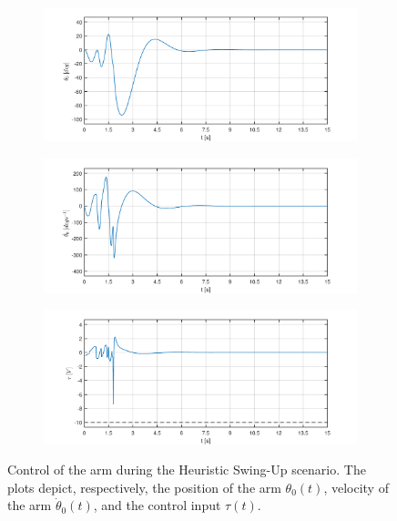 \begin{figure}[H]
	\centering
	\begin{subfigure}
		\centering
		\includegraphics[scale=0.6]{images/Hswing/arm.pdf}  
	\end{subfigure}
	\begin{subfigure}
		\centering
		\includegraphics[scale=0.6]{images/Hswing/darm.pdf}  
	\end{subfigure}
	\begin{subfigure}
		\centering
		\includegraphics[scale=0.6]{images/Hswing/control.pdf}  
	\end{subfigure}
	\caption{Control of the arm during the Heuristic Swing-Up scenario. The plots depict, respectively, the position of the arm $\theta_0(t)$, velocity of the arm $\dot{\theta}_0(t)$, and the control input $\tau(t)$.}
	\label{combo}
\end{figure}
